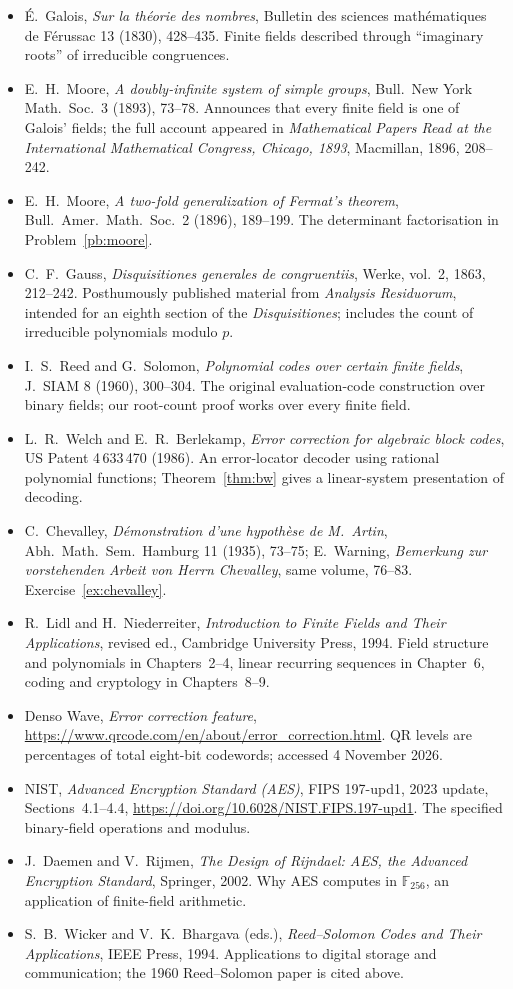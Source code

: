 \begin{itemize}
\item \'E.~Galois, \emph{Sur la théorie des nombres}, Bulletin des sciences mathématiques de Férussac 13 (1830), 428--435. Finite fields described through ``imaginary roots'' of irreducible congruences.
\item E.~H.~Moore, \emph{A doubly-infinite system of simple groups}, Bull.\ New York Math.\ Soc.\ 3 (1893), 73--78. Announces that every finite field is one of Galois' fields; the full account appeared in \emph{Mathematical Papers Read at the International Mathematical Congress, Chicago, 1893}, Macmillan, 1896, 208--242.
\item E.~H.~Moore, \emph{A two-fold generalization of Fermat's theorem}, Bull.\ Amer.\ Math.\ Soc.\ 2 (1896), 189--199. The determinant factorisation in Problem~\ref{pb:moore}.
\item C.~F.~Gauss, \emph{Disquisitiones generales de congruentiis}, Werke, vol.~2, 1863, 212--242. Posthumously published material from \emph{Analysis Residuorum}, intended for an eighth section of the \emph{Disquisitiones}; includes the count of irreducible polynomials modulo $p$.
\item I.~S.~Reed and G.~Solomon, \emph{Polynomial codes over certain finite fields}, J.\ SIAM 8 (1960), 300--304. The original evaluation-code construction over binary fields; our root-count proof works over every finite field.
\item L.~R.~Welch and E.~R.~Berlekamp, \emph{Error correction for algebraic block codes}, US Patent 4\,633\,470 (1986). An error-locator decoder using rational polynomial functions; Theorem~\ref{thm:bw} gives a linear-system presentation of decoding.
\item C.~Chevalley, \emph{Démonstration d'une hypothèse de M.~Artin}, Abh.\ Math.\ Sem.\ Hamburg 11 (1935), 73--75; E.~Warning, \emph{Bemerkung zur vorstehenden Arbeit von Herrn Chevalley}, same volume, 76--83. Exercise~\ref{ex:chevalley}.
\item R.~Lidl and H.~Niederreiter, \emph{Introduction to Finite Fields and Their Applications}, revised ed., Cambridge University Press, 1994. Field structure and polynomials in Chapters~2--4, linear recurring sequences in Chapter~6, coding and cryptology in Chapters~8--9.
\item Denso Wave, \emph{Error correction feature}, \url{https://www.qrcode.com/en/about/error_correction.html}. QR levels are percentages of total eight-bit codewords; accessed 4 November 2026.
\item NIST, \emph{Advanced Encryption Standard (AES)}, FIPS 197-upd1, 2023 update, Sections~4.1--4.4, \url{https://doi.org/10.6028/NIST.FIPS.197-upd1}. The specified binary-field operations and modulus.
\item J.~Daemen and V.~Rijmen, \emph{The Design of Rijndael: AES, the Advanced Encryption Standard}, Springer, 2002. Why AES computes in $\mathbb F_{256}$, an application of finite-field arithmetic.
\item S.~B.~Wicker and V.~K.~Bhargava (eds.), \emph{Reed--Solomon Codes and Their Applications}, IEEE Press, 1994. Applications to digital storage and communication; the 1960 Reed--Solomon paper is cited above.
\end{itemize}
